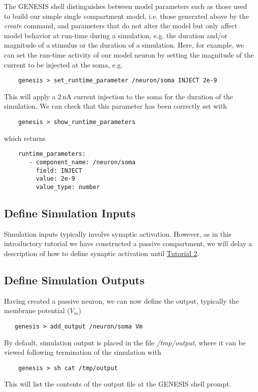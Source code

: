 \documentclass[12pt]{article}
\begin{document}
The GENESIS shell distinguishes between model parameters such as those used to build our simple single compartment model, i.e. those generated above by the {\it create} command, and parameters that do not alter the model but only affect model behavior at run-time during a simulation, e.g. the duration and/or magnitude of a stimulus or the duration of a simulation. Here, for example, we can set the run-time activity of our model neuron by setting the magnitude of the current to be injected at the soma, e.g. 
\begin{verbatim}
    genesis > set_runtime_parameter /neuron/soma INJECT 2e-9
\end{verbatim}
This will apply a 2\,nA current injection to the soma for the duration of the simulation. We can check that this parameter has been correctly set with
\begin{verbatim}
    genesis > show_runtime_parameters
\end{verbatim}
which returns
\begin{verbatim}
    runtime_parameters:
       - component_name: /neuron/soma
         field: INJECT
         value: 2e-9
         value_type: number
\end{verbatim}

\subsection*{Define Simulation Inputs}

Simulation inputs typically involve synaptic activation. However, as in this introductory tutorial we have constructed a passive compartment, we will delay a description of how to define synaptic activation until \href{../tutorial2/tutorial2.tex}{Tutorial 2}.  

\subsection*{Define Simulation Outputs}

Having created a passive neuron, we can now define the output, typically the membrane potential ($V_m$)
\begin{verbatim}
   genesis > add_output /neuron/soma Vm
\end{verbatim}
By default, simulation output is placed in the file {\it /tmp/output}, where it can be viewed following termination of the simulation with
\begin{verbatim}
    genesis > sh cat /tmp/output
\end{verbatim}
This will list the contents of the output file at the GENESIS shell prompt.
\end{document}
